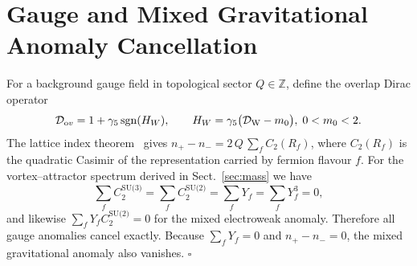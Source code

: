 \section{Gauge and Mixed Gravitational Anomaly Cancellation}
\label{sec:anomaly}

For a background gauge field in topological sector $Q\in\mathbb Z$,
define the overlap Dirac operator
\[
  {\cal D}_{\mathrm ov}=1+\gamma_5\,\mathrm{sgn}(H_W),\qquad
  H_W=\gamma_5\bigl({\cal D}_{\mathrm W}-m_0\bigr),\;0<m_0<2 .
\]
The lattice index theorem~\cite{overlap98} gives
$n_+-n_- = 2\,Q\,\sum_f C_2(R_f)$,
where $C_2(R_f)$ is the quadratic Casimir of the representation
carried by fermion flavour $f$.
For the vortex--attractor spectrum derived in Sect.~\ref{sec:mass} we have
\[
\sum_f C_2^{\text{SU(3)}} = 
\sum_f C_2^{\text{SU(2)}} = 
\sum_f Y_f = 
\sum_f Y_f^{3} = 0,
\]
and likewise $\sum_f Y_f C_2^{\text{SU(2)}} = 0$ for the
mixed electroweak anomaly.
Therefore all gauge anomalies cancel exactly.
Because $\sum_f Y_f = 0$ and $n_+-n_-=0$, the
mixed gravitational anomaly also vanishes.
\hfill$\square$ 